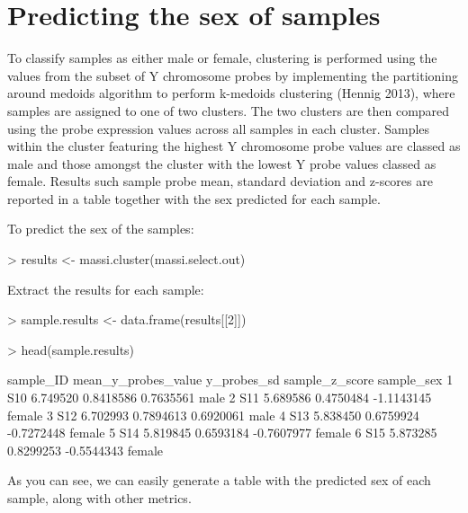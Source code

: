 \documentclass{article}
\begin{document}
\section{Predicting the sex of samples}

To classify samples as either male or female, clustering is performed using the values from the subset of Y chromosome probes  by implementing the partitioning around medoids algorithm to perform k-medoids clustering (Hennig 2013), where samples are assigned to one of two clusters. The two clusters are then compared using the probe expression values across all samples in each cluster. Samples within the cluster featuring the highest Y chromosome probe values are classed as male and those amongst the cluster with the lowest Y probe values classed as female. Results such sample probe mean, standard deviation and z-scores are reported in a table together with the sex predicted for each sample.

To predict the sex of the samples:
\begin{Schunk}
\begin{Sinput}
> results <- massi.cluster(massi.select.out)
\end{Sinput}
\end{Schunk}

Extract the results for each sample:
\begin{Schunk}
\begin{Sinput}
> sample.results <- data.frame(results[[2]])
\end{Sinput}
\end{Schunk}

\begin{Schunk}
\begin{Sinput}
> head(sample.results)
\end{Sinput}
\begin{Soutput}
  sample_ID mean_y_probes_value y_probes_sd sample_z_score sample_sex
1       S10            6.749520   0.8418586      0.7635561       male
2       S11            5.689586   0.4750484     -1.1143145     female
3       S12            6.702993   0.7894613      0.6920061       male
4       S13            5.838450   0.6759924     -0.7272448     female
5       S14            5.819845   0.6593184     -0.7607977     female
6       S15            5.873285   0.8299253     -0.5544343     female
\end{Soutput}
\end{Schunk}

As you can see, we can easily generate a table with the predicted sex of each sample, along with other metrics.
\end{document}
